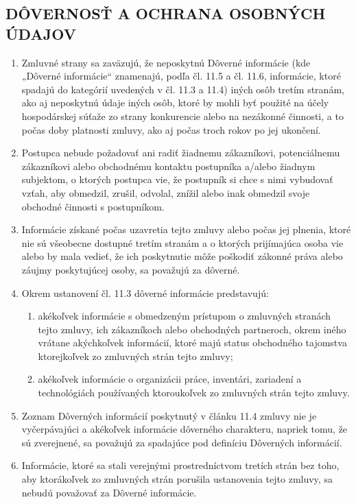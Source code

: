 \documentclass[a4paper]{article}
\begin{document}
\begin{multicols}{2}
\subsection{DÔVERNOSŤ A OCHRANA OSOBNÝCH ÚDAJOV}
\begin{enumerate}
    \item Zmluvné strany sa zaväzujú, že neposkytnú Dôverné informácie (kde „Dôverné informácie“ znamenajú, podľa čl. 11.5 a čl. 11.6, informácie, ktoré spadajú do kategórií uvedených v čl. 11.3 a 11.4) iných osôb tretím stranám, ako aj neposkytnú údaje iných osôb, ktoré by mohli byť použité na účely hospodárskej súťaže zo strany konkurencie alebo na nezákonné činnosti, a to počas doby platnosti zmluvy, ako aj počas troch rokov po jej ukončení.
    \item Postupca nebude požadovať ani radiť žiadnemu zákazníkovi, potenciálnemu zákazníkovi alebo obchodnému kontaktu postupníka a/alebo žiadnym subjektom, o ktorých postupca vie, že postupník si chce s nimi vybudovať vzťah, aby obmedzil, zrušil, odvolal, znížil alebo inak obmedzil svoje obchodné činnosti s postupníkom.
    \item Informácie získané počas uzavretia tejto zmluvy alebo počas jej plnenia, ktoré nie sú všeobecne dostupné tretím stranám a o ktorých prijímajúca osoba vie alebo by mala vedieť, že ich poskytnutie môže poškodiť zákonné práva alebo záujmy poskytujúcej osoby, sa považujú za dôverné.
    \item Okrem ustanovení čl. 11.3 dôverné informácie predstavujú:
    \begin{enumerate}
    \item akékoľvek informácie s obmedzeným prístupom o zmluvných stranách tejto zmluvy, ich zákazníkoch alebo obchodných partneroch, okrem iného vrátane akýchkoľvek informácií, ktoré majú status obchodného tajomstva ktorejkoľvek zo zmluvných strán tejto zmluvy;
    \item akékoľvek informácie o organizácii práce, inventári, zariadení a technológiách používaných ktoroukoľvek zo zmluvných strán tejto zmluvy.
    \end{enumerate}
    \item Zoznam Dôverných informácií poskytnutý v článku 11.4 zmluvy nie je vyčerpávajúci a akékoľvek informácie dôverného charakteru, napriek tomu, že sú zverejnené, sa považujú za spadajúce pod definíciu Dôverných informácií.
    \item Informácie, ktoré sa stali verejnými prostredníctvom tretích strán bez toho, aby ktorákoľvek zo zmluvných strán porušila ustanovenia tejto zmluvy, sa nebudú považovať za Dôverné informácie.

\end{enumerate}
\end{multicols}
\end{document}
